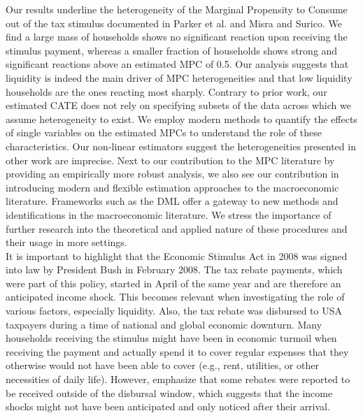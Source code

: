 Our results underline the heterogeneity of the Marginal Propensity to Consume out of the tax stimulus documented in Parker et al. and Misra and Surico. We find a large mass of households shows no significant reaction upon receiving the stimulus payment, whereas a smaller fraction of households shows strong and significant reactions above an estimated MPC of 0.5. Our analysis suggests that liquidity is indeed the main driver of MPC heterogeneities and that low liquidity households are the ones reacting most sharply. Contrary to prior work, our estimated CATE does not rely on specifying subsets of the data across which we assume heterogeneity to exist. We employ modern methods to quantify the effects of single variables on the estimated MPCs to understand the role of these characteristics. Our non-linear estimators suggest the heterogeneities presented in other work are imprecise. Next to our contribution to the MPC literature by providing an empirically more robust analysis, we also see our contribution in introducing modern and flexible estimation approaches to the macroeconomic literature. Frameworks such as the DML offer a gateway to new methods and identifications in the macroeconomic literature. We stress the importance of further research into the theoretical and applied nature of these procedures and their usage in more settings. \\
It is important to highlight that the Economic Stimulus Act in 2008 was signed into law by President Bush in February 2008. The tax rebate payments, which were part of this policy, started in April of the same year and are therefore an anticipated income shock. This becomes relevant when investigating the role of various factors, especially liquidity. Also, the tax rebate was disbursed to USA taxpayers during a time of national and global economic downturn. Many households receiving the stimulus might have been in economic turmoil when receiving the payment and actually spend it to cover regular expenses that they otherwise would not have been able to cover (e.g., rent, utilities, or other necessities of daily life). However, \cite{parker_etal_13} emphasize that some rebates were reported to be received outside of the disbursal window, which suggests that the income shocks might not have been anticipated and only noticed after their arrival. \\
